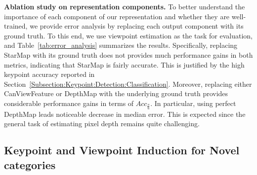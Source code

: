 \documentclass[runningheads]{llncs}
\begin{document}
\noindent\textbf{Ablation study on representation components.} To better understand the importance of each component of our representation and whether they are well-trained, we provide error analysis by replacing each output component with its ground truth. To this end, we use viewpoint estimation as the task for evaluation, and Table~\ref{tab:error_analysis} summarizes the results. 
Specifically, replacing {StarMap} with its ground truth does not provides much performance gains in both metrics, indicating that {StarMap} is fairly accurate. 
This is justified by the high keypoint accuracy reported in  Section~\ref{Subsection:Keypoint:Detection:Classification}. 
Moreover, replacing either {CanViewFeature} or {DepthMap} with the underlying ground truth provides considerable performance gains in terms of $\mathit{Acc}_\frac{\pi}{6}$. 
In particular, using perfect {DepthMap} leads noticeable decrease in median error. 
This is expected since the general task of estimating pixel depth remains quite challenging.  


\subsection{Keypoint and Viewpoint Induction for Novel categories}
\label{Subsection:PoseInduction}

\begin{table}[t]
\scriptsize
{}
{\caption{Viewpoint estimation for novel categories results on ObjectNet3D+~\cite{xiang2016objectnet3d}. We shown our results in $\mathit{Acc}_\frac{\pi}{6}$. }
\label{table:objectNet3D}}
\end{table}
\end{document}
